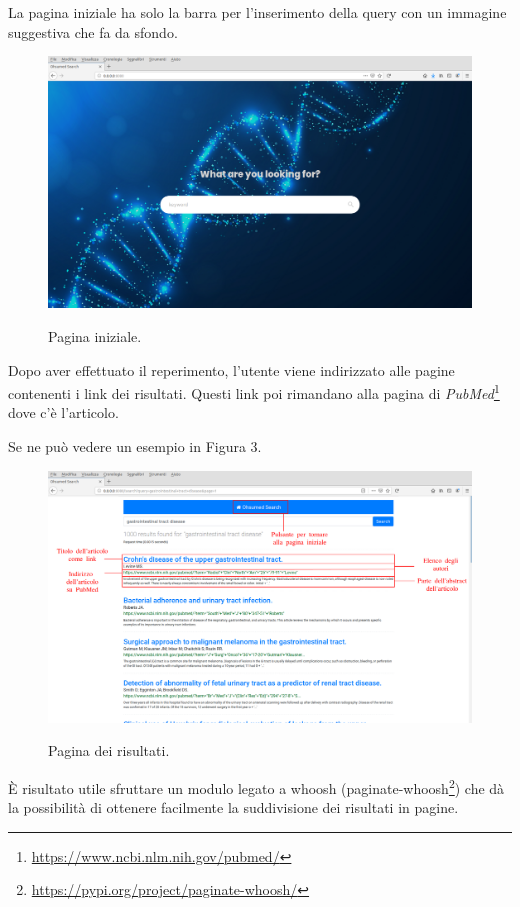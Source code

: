 \documentclass[runningheads]{llncs}
\begin{document}
La pagina iniziale ha solo la barra per l'inserimento della query con un immagine suggestiva che fa da sfondo. 

\begin{figure}%
    \centering
    {{\includegraphics[width=1\linewidth]{index} }}%
    \caption{Pagina iniziale.}%
\end{figure}

Dopo aver effettuato il reperimento, l'utente viene indirizzato alle pagine contenenti
i link dei risultati.
Questi link poi rimandano alla pagina di \emph{PubMed}\footnote{\url{https://www.ncbi.nlm.nih.gov/pubmed/}} dove c'\`e l'articolo.

Se ne pu\`o vedere un esempio in Figura 3.

\begin{figure}%
    \centering
    {{\includegraphics[width=1\linewidth]{risultati} }}%
    \caption{Pagina dei risultati.}%
\end{figure}

\`E risultato utile sfruttare un modulo legato a whoosh (paginate-whoosh\footnote{\url{https://pypi.org/project/paginate-whoosh/}})
che d\`a la possibilit\`a di ottenere facilmente la suddivisione dei risultati in pagine.
\end{document}
